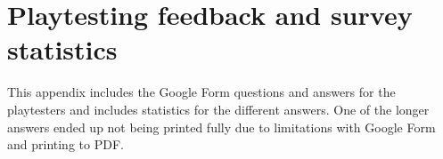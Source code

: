 \chapter{Playtesting feedback and survey statistics}
\label{app:testFeedback}
This appendix includes the Google Form questions and answers for the playtesters and includes statistics for the different answers. One of the longer answers ended up not being printed fully due to limitations with Google Form and printing to PDF. 

